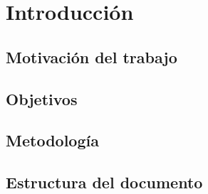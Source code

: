 \newpage %
\thispagestyle{empty}
\mbox{}

\chapter{Introducción} 
\label{ch:introduccion}
\section{Motivación del trabajo}

\section{Objetivos}

\section{Metodología}

\section{Estructura del documento}